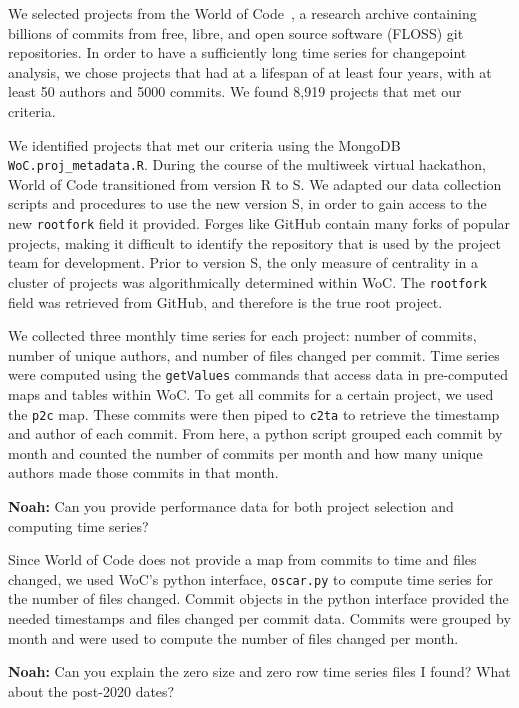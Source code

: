 \documentclass[10pt,conference]{IEEEtran}
\begin{document}
We selected projects from the World of Code~\cite{ma2019world}, a research archive containing billions of commits from free, libre, and open source software (FLOSS) git repositories. In order to have a sufficiently long time series for changepoint analysis, we chose projects that had at a lifespan of at least four years, with at least 50 authors and 5000 commits. We found 8,919 projects that met our criteria.

We identified projects that met our criteria using the MongoDB \texttt{WoC.proj\_metadata.R}. During the course of the multiweek virtual hackathon, World of Code transitioned from version R to S. We adapted our data collection scripts and procedures to use the new version S, in order to gain access to the new \texttt{rootfork} field it provided. Forges like GitHub contain many forks of popular projects, making it difficult to identify the repository that is used by the project team for development. Prior to version S, the only measure of centrality in a cluster of projects was algorithmically determined within WoC. The \texttt{rootfork} field was retrieved from GitHub, and therefore is the true root project.

We collected three monthly time series for each project: number of commits, number of unique authors, and number of files changed per commit. Time series were computed using the \texttt{getValues} commands that access data in pre-computed maps and tables within WoC. To get all commits for a certain project, we used the \texttt{p2c} map. These commits were then piped to \texttt{c2ta} to retrieve the timestamp and author of each commit. From here, a python script grouped each commit by month and counted the number of commits per month and how many unique authors made those commits in that month.

\textbf{Noah:} Can you provide performance data for both project selection and computing time series?

Since World of Code does not provide a map from commits to time and files changed, we used WoC's python interface, \texttt{oscar.py} to compute time series for the number of files changed. Commit objects in the python interface provided the needed timestamps and files changed per commit data. Commits were grouped by month and were used to compute the number of files changed per month.

\textbf{Noah:} Can you explain the zero size and zero row time series files I found? What about the post-2020 dates?\\
\end{document}
